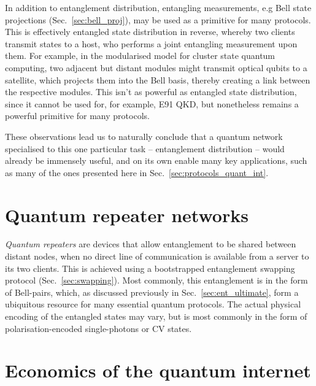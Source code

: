 \documentclass[aps,rmp,twocolumn,amsmath,amssymb,nofootinbib,superscriptaddress,longbibliography,floatfix,table-of-contents,eqsecnum]{revtex4-1}
\newcommand{\comment}[1]{{\color{blue}{\textbf{#1}}}}
\begin{document}
\comment{Any other advantages?}

In addition to entanglement distribution, entangling measurements, e.g Bell state projections (Sec.~\ref{sec:bell_proj}), may be used as a primitive for many protocols. This is effectively entangled state distribution in reverse, whereby two clients transmit states to a host, who performs a joint entangling measurement upon them. For example, in the modularised model for cluster state quantum computing, two adjacent but distant modules might transmit optical qubits to a satellite, which projects them into the Bell basis, thereby creating a link between the respective modules. This isn't as powerful as entangled state distribution, since it cannot be used for, for example, E91 QKD, but nonetheless remains a powerful primitive for many protocols.

These observations lead us to naturally conclude that a quantum network specialised to this one particular task -- entanglement distribution -- would already be immensely useful, and on its own enable many key applications, such as many of the ones presented here in Sec.~\ref{sec:protocols_quant_int}.

%
%

\section{Quantum repeater networks} \label{sec:rep_net} 

\textit{Quantum repeaters} are devices that allow entanglement to be shared between distant nodes, when no direct line of communication is available from a server to its two clients. This is achieved using a bootstrapped entanglement swapping protocol (Sec.~\ref{sec:swapping}). Most commonly, this entanglement is in the form of Bell-pairs, which, as discussed previously in Sec.~\ref{sec:ent_ultimate}, form a ubiquitous resource for many essential quantum protocols. The actual physical encoding of the entangled states may vary, but is most commonly in the form of polarisation-encoded single-photons or CV states.

\comment{To do by Bill Munro}

%
%

\section{Economics of the quantum internet} 
\end{document}
